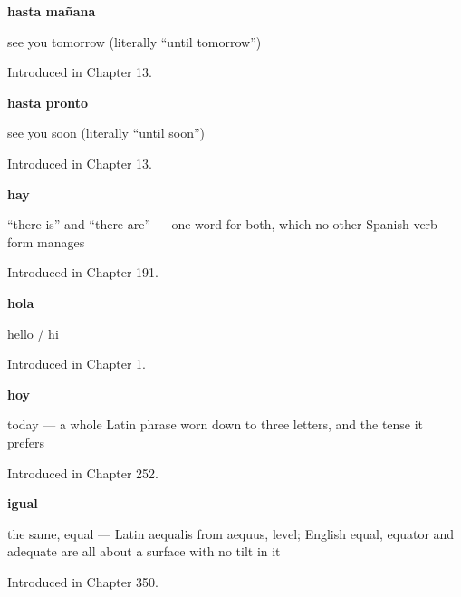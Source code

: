 \noindent\begin{minipage}[t]{\linewidth}
\raggedright
\textbf{hasta mañana}\par
\small see you tomorrow (literally \textquotedblleft{}until tomorrow\textquotedblright{})\par
\footnotesize Introduced in Chapter 13.
\end{minipage}\par\medskip

\noindent\begin{minipage}[t]{\linewidth}
\raggedright
\textbf{hasta pronto}\par
\small see you soon (literally \textquotedblleft{}until soon\textquotedblright{})\par
\footnotesize Introduced in Chapter 13.
\end{minipage}\par\medskip

\noindent\begin{minipage}[t]{\linewidth}
\raggedright
\textbf{hay}\par
\small \textquotedblleft{}there is\textquotedblright{} and \textquotedblleft{}there are\textquotedblright{} — one word for both, which no other Spanish verb form manages\par
\footnotesize Introduced in Chapter 191.
\end{minipage}\par\medskip

\noindent\begin{minipage}[t]{\linewidth}
\raggedright
\textbf{hola}\par
\small hello / hi\par
\footnotesize Introduced in Chapter 1.
\end{minipage}\par\medskip

\noindent\begin{minipage}[t]{\linewidth}
\raggedright
\textbf{hoy}\par
\small today — a whole Latin phrase worn down to three letters, and the tense it prefers\par
\footnotesize Introduced in Chapter 252.
\end{minipage}\par\medskip

\noindent\begin{minipage}[t]{\linewidth}
\raggedright
\textbf{igual}\par
\small the same, equal — Latin aequalis from aequus, level; English equal, equator and adequate are all about a surface with no tilt in it\par
\footnotesize Introduced in Chapter 350.
\end{minipage}\par\medskip

